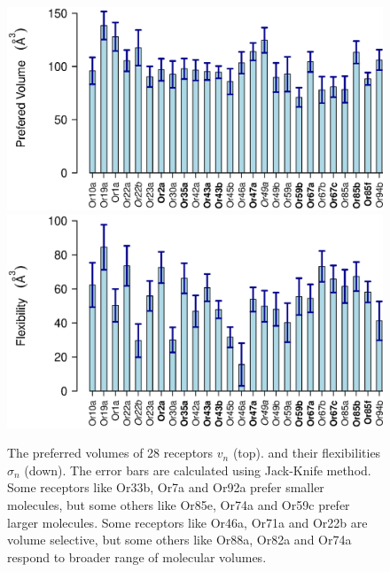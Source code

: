 \documentclass[11pt]{paper} %
\newcommand{\numberofreceptors}{ 28 }
\begin{document}
\begin{figure}
		\centering
		\includegraphics[width=  0.85 \textwidth]{fig/mean-vol}
		\includegraphics[width=  0.85 \textwidth]{fig/std-vol}
	\caption{The preferred volumes of \numberofreceptors receptors $v_n$ (top). 
		and their flexibilities $\sigma_n$ (down). 
		The error bars are calculated using Jack-Knife method. 
		Some receptors like Or33b, Or7a and  Or92a prefer smaller molecules, 
		but some others like Or85e,  Or74a and  Or59c prefer larger molecules.
		Some receptors like Or46a,  Or71a and Or22b are volume  selective, 
		but some others like Or88a,  Or82a and  Or74a respond to broader range of molecular volumes.
		}
		\label{fig:preferred_volume}
		\label{fig:volume_flexibility}
\end{figure}
\end{document}
